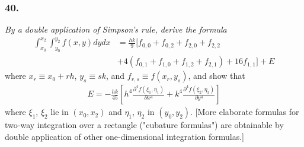 \documentclass[12pt]{article}
\begin{document}
\subsubsection*{40.}
{\it By a double application of Simpson's rule, derive the formula}
\begin{align*}
	\int_{x_0}^{x_2}\int_{y_0}^{y_2} f(x, y) dy dx &= \frac{hk}{9}\Big[f_{0,0} + f_{0,2} + f_{2,0} + f_{2,2} \\
	&+ 4(f_{0,1} + f_{1,0} + f_{1,2} + f_{2,1}) + 16f_{1,1}\Big] + E
\end{align*}
where $x_r \equiv x_0 + rh$, $y_s \equiv sk$, and $f_{r,s} \equiv f(x_r, y_s)$, and show that
\begin{align*}
	E = -\frac{hk}{45}\left[h^4\frac{\partial^4f(\xi_1, \eta_1)}{\partial x^4} + k^4\frac{\partial^4f(\xi_2, \eta_2)}{\partial y^4}\right]
\end{align*}
where $\xi_1$, $\xi_2$ lie in $(x_0, x_2)$ and $\eta_1$, $\eta_2$ in $(y_0, y_2)$.  [More elaborate formulas for two-way integration over a rectangle ("cubature formulas") are obtainable by double application of other one-dimensional integration formulas.] \\
\end{document}
